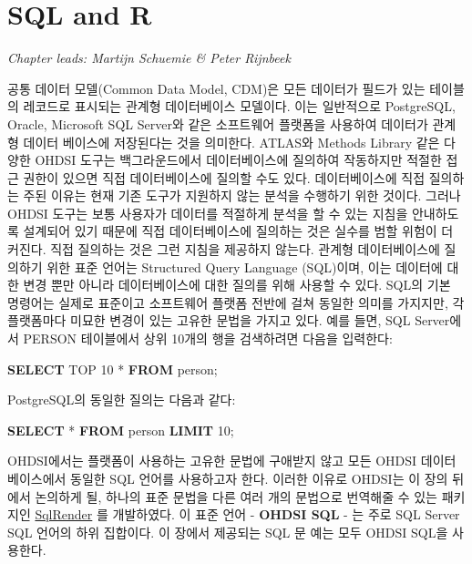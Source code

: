 \documentclass[11pt]{book}
\newenvironment{Shaded}{\begin{snugshade}}{\end{snugshade}}
\newcommand{\KeywordTok}[1]{\textcolor[rgb]{0.13,0.29,0.53}{\textbf{#1}}}
\newcommand{\DecValTok}[1]{\textcolor[rgb]{0.00,0.00,0.81}{#1}}
\newcommand{\NormalTok}[1]{#1}
\theoremstyle{definition}
\theoremstyle{definition}
\theoremstyle{definition}
\theoremstyle{remark}
\begin{document}
\chapter{SQL and R}\label{SqlAndR}

\emph{Chapter leads: Martijn Schuemie \& Peter Rijnbeek}

공통 데이터 모델(Common Data Model, CDM)은 모든 데이터가 필드가 있는
테이블의 레코드로 표시되는 관계형 데이터베이스 모델이다. 이는 일반적으로
PostgreSQL, Oracle, Microsoft SQL Server와 같은 소프트웨어 플랫폼을
사용하여 데이터가 관계형 데이터 베이스에 저장된다는 것을 의미한다.
ATLAS와 Methods Library 같은 다양한 OHDSI 도구는 백그라운드에서
데이터베이스에 질의하여 작동하지만 적절한 접근 권한이 있으면 직접
데이터베이스에 질의할 수도 있다. 데이터베이스에 직접 질의하는 주된
이유는 현재 기존 도구가 지원하지 않는 분석을 수행하기 위한 것이다.
그러나 OHDSI 도구는 보통 사용자가 데이터를 적절하게 분석을 할 수 있는
지침을 안내하도록 설계되어 있기 때문에 직접 데이터베이스에 질의하는 것은
실수를 범할 위험이 더 커진다. 직접 질의하는 것은 그런 지침을 제공하지
않는다. 관계형 데이터베이스에 질의하기 위한 표준 언어는 Structured Query
Language (SQL)이며, 이는 데이터에 대한 변경 뿐만 아니라 데이터베이스에
대한 질의를 위해 사용할 수 있다. SQL의 기본 명령어는 실제로 표준이고
소프트웨어 플랫폼 전반에 걸쳐 동일한 의미를 가지지만, 각 플랫폼마다
미묘한 변경이 있는 고유한 문법을 가지고 있다. 예를 들면, SQL Server에서
PERSON 테이블에서 상위 10개의 행을 검색하려면 다음을 입력한다:
 

\begin{Shaded}
\begin{Highlighting}[]
\KeywordTok{SELECT}\NormalTok{ TOP }\DecValTok{10}\NormalTok{ * }\KeywordTok{FROM}\NormalTok{ person;}
\end{Highlighting}
\end{Shaded}

PostgreSQL의 동일한 질의는 다음과 같다:

\begin{Shaded}
\begin{Highlighting}[]
\KeywordTok{SELECT}\NormalTok{ * }\KeywordTok{FROM}\NormalTok{ person }\KeywordTok{LIMIT} \DecValTok{10}\NormalTok{;}
\end{Highlighting}
\end{Shaded}

OHDSI에서는 플랫폼이 사용하는 고유한 문법에 구애받지 않고 모든 OHDSI
데이터베이스에서 동일한 SQL 언어를 사용하고자 한다. 이러한 이유로
OHDSI는 이 장의 뒤에서 논의하게 될, 하나의 표준 문법을 다른 여러 개의
문법으로 번역해줄 수 있는 패키지인
\href{https://ohdsi.github.io/SqlRender/}{SqlRender} 를 개발하였다. 이
표준 언어 - \textbf{OHDSI SQL} - 는 주로 SQL Server SQL 언어의 하위
집합이다. 이 장에서 제공되는 SQL 문 예는 모두 OHDSI SQL을 사용한다.
 
\end{document}
